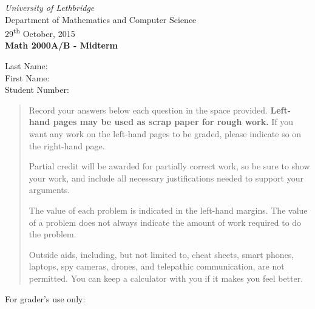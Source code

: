 \documentclass[12pt]{article}
\newcommand{\skipline}{\vspace{12pt}}
\begin{document}
\author{Instructor: Sean Fitzpatrick}
\thispagestyle{plain}
\begin{center}
\emph{University of Lethbridge}\\
Department of Mathematics and Computer Science\\
29\textsuperscript{th} October, 2015\\
{\bf Math 2000A/B - Midterm}\\
\end{center}
\skipline \skipline \skipline \noindent \skipline
Last Name:\underline{\hspace{50pt}{\bf SOLUTIONS}\hspace{50pt}}\\
\skipline
First Name:\underline{\hspace{50pt}{\bf THE}\hspace{100pt}}\\
\skipline
Student Number:\underline{\hspace{322pt}}\\


\vspace{0.5in}


\begin{quote}
 Record your answers below each question in the space provided.    {\bf Left-hand pages may be used as scrap paper for rough work.}  If you want any work on the left-hand pages to be graded, please indicate so on the right-hand page.
 
 \bigskip
 
Partial credit will be awarded for partially correct work, so be sure to show your work, and include all necessary justifications needed to support your arguments. 

The value of each problem is indicated in the left-hand margins. The value of a problem does not always indicate the amount of work required to do the problem.

Outside aids, including, but not limited to, cheat sheets, smart phones, laptops, spy cameras, drones, and telepathic communication, are not permitted. You can keep a calculator with you if it makes you feel better.
\end{quote}


\vspace{0.5in}

For grader's use only:
\end{document}
